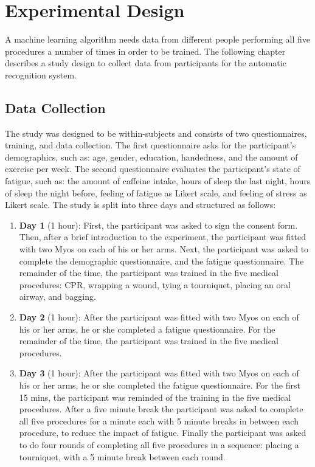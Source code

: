 \section{Experimental Design}
\label{sec:Experimental-Design}
A machine learning algorithm needs data from different people performing all five procedures a number of times in order to be trained. The following chapter describes a study design to collect data from participants for the automatic recognition system. 

\subsection{Data Collection}
\label{sec:Experimental-Design:Data-Collection}
The study was designed to be within-subjects and consists of two questionnaires, training, and data collection. The first questionnaire asks for the participant's demographics, such as: age, gender, education, handedness, and the amount of exercise per week. The second questionnaire evaluates the participant's state of fatigue, such as: the amount of caffeine intake, hours of sleep the last night, hours of sleep the night before, feeling of fatigue as Likert scale, and feeling of stress as Likert scale. The study is split into three days and structured as follows:
\begin{enumerate}
	\item \textbf{Day 1} (1 hour): First, the participant was asked to sign the consent form. Then, after a brief introduction to the experiment, the participant was fitted with two Myos on each of his or her arms. Next, the participant was asked to complete the demographic questionnaire, and the fatigue questionnaire. The remainder of the time, the participant was trained in the five medical procedures: CPR, wrapping a wound, tying a tourniquet, placing an oral airway, and bagging.
	\item \textbf{Day 2} (1 hour): After the participant was fitted with two Myos on each of his or her arms, he or she completed a fatigue questionnaire. For the remainder of the time, the participant was trained in the five medical procedures.
	\item \textbf{Day 3} (1 hour): After the participant was fitted with two Myos on each of his or her arms, he or she completed the fatigue questionnaire. For the first 15 mins, the participant was reminded of the training in the five medical procedures.
	After a five minute break the participant was asked to complete all five procedures for a minute each with 5 minute breaks in between each procedure, to reduce the impact of fatigue. Finally the participant was asked to do four rounds of completing all five procedures in a sequence: placing a tourniquet,  with a 5 minute break between each round.
\end{enumerate}

